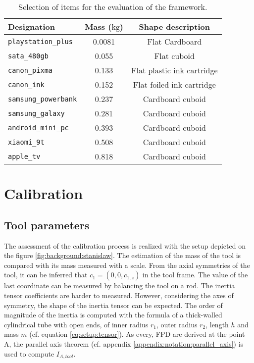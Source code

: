 \documentclass[/home/francois/latex/report/main.tex]{subfiles}
\begin{document}
\begin{table}[h]
  \begin{center}
    \renewcommand{\arraystretch}{1.2} %
    \begin{tabular}{l|c|c} %
      \textbf{Designation} & \textbf{Mass ($\si{\kilogram}$)} & \textbf{Shape description}\\
      \hline
      \texttt{playstation\_plus}  & 0.0081 & Flat Cardboard \\
      \hline
      \texttt{sata\_480gb}  & 0.055 & Flat cuboid \\
      \hline
      \texttt{canon\_pixma}  & 0.133 & Flat plastic ink cartridge \\
      \hline
      \texttt{canon\_ink}  & 0.152 & Flat foiled ink cartridge \\
      \hline
      \texttt{samsung\_powerbank}  & 0.237 & Cardboard cuboid \\
      \hline
      \texttt{samsung\_galaxy}  & 0.281 & Cardboard cuboid \\
      \hline
      \texttt{android\_mini\_pc}  & 0.393 & Cardboard cuboid \\
      \hline
      \texttt{xiaomi\_9t}  & 0.508 & Cardboard cuboid \\
      \hline
      \texttt{apple\_tv}  & 0.818 & Cardboard cuboid \\
      \hline
    \end{tabular}
  \end{center}
  \caption{Selection of items for the evaluation of the framework.\label{tab:setup:items}}
\end{table}

\section{Calibration}

\subsection{Tool parameters}

The assessment of the calibration process is realized with the setup depicted on the figure \ref{fig:background:stanislaw}. The estimation of the mass of the tool is compared with its mass measured with a scale. From the axial symmetries of the tool, it can be inferred that $c_1 = (0, 0, c_{1,z})$ in the tool frame. The value of the last coordinate can be measured by balancing the tool on a rod. The inertia tensor coefficients are harder to measured. However, considering the axes of symmetry, the shape of the inertia tensor can be expected. The order of magnitude of the inertia is computed with the formula of a thick-walled cylindrical tube with open ends, of inner radius $r_1$, outer radius $r_2$, length $h$ and mass $m$ (cf. equation \ref{eq:setup:tensor}). As every, \ac{FPD} are derived at the point A, the parallel axis theorem (cf. appendix \ref{appendix:notation:parallel_axis}) is used to compute $I_{A, tool}$.
\end{document}
